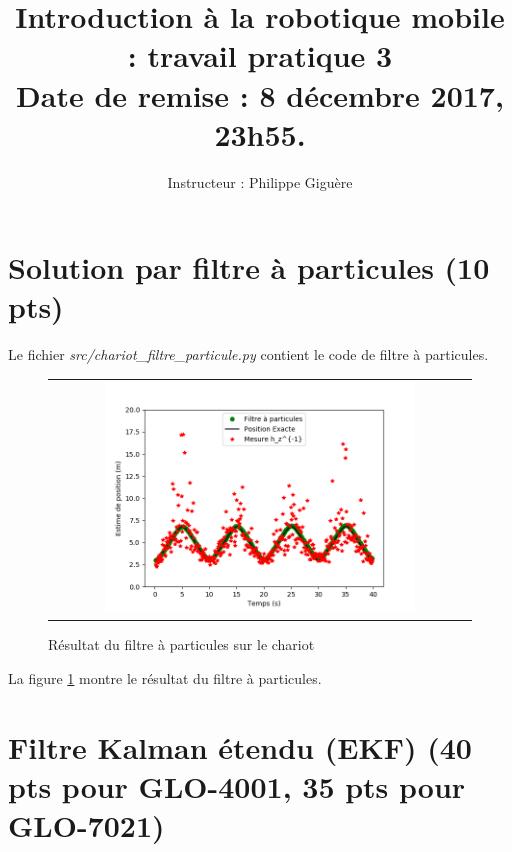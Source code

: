 \documentclass[12pt]{article}
\begin{document}
\title{Introduction à la robotique mobile : travail pratique 3  \\  Date de remise : 8 décembre 2017, 23h55.}
\author{Instructeur : Philippe Giguère}

\maketitle

\section {Solution par filtre à particules (10 pts)}
Le fichier \textit{src/chariot\_filtre\_particule.py} contient le code de filtre \`a particules.

\begin{figure}[ht]
 \begin{center}
  \begin{tabular}{c}
    \includegraphics[width=0.75\textwidth]{fig/filtre-particule-chariot.png}
  \end{tabular}
 \end{center}
\vspace{-0.25in}
 \caption{Résultat du filtre à particules sur le chariot}
    \label{chariot-filtre-particule}
\end{figure}

La figure \ref{chariot-filtre-particule} montre le r\'esultat du filtre à particules.

\begin{figure}
\end{figure}

\section{Filtre Kalman étendu (EKF) (40 pts pour GLO-4001, 35 pts pour GLO-7021)}
\label{EKF}
\end{document}
